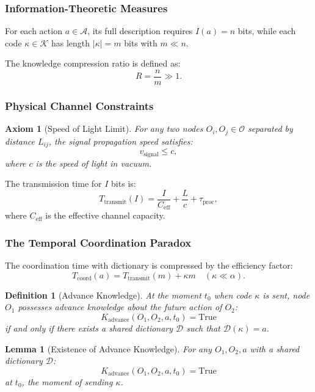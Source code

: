 \documentclass[11pt,a4paper]{article}
\newtheorem{lemma}{Lemma}
\newtheorem{axiom}{Axiom}
\newtheorem{definition}{Definition}
\begin{document}
\subsubsection{Information-Theoretic Measures}

For each action $a \in \mathcal{A}$, its full description requires $I(a) = n$ bits, while each code $\kappa \in \mathcal{K}$ has length $|\kappa| = m$ bits with $m \ll n$.

The knowledge compression ratio is defined as:
\[
R = \frac{n}{m} \gg 1.
\]

\subsubsection{Physical Channel Constraints}

\begin{axiom}[Speed of Light Limit]
	For any two nodes $O_i, O_j \in \mathcal{O}$ separated by distance $L_{ij}$, the signal propagation speed satisfies:
	\[
	v_{\text{signal}} \leq c,
	\]
	where $c$ is the speed of light in vacuum.
\end{axiom}

The transmission time for $I$ bits is:
\[
T_{\text{transmit}}(I) = \frac{I}{C_{\text{eff}}} + \frac{L}{c} + \tau_{\text{proc}},
\]
where $C_{\text{eff}}$ is the effective channel capacity.

\subsubsection{The Temporal Coordination Paradox}

The coordination time with dictionary is compressed by the efficiency factor:
\[
T_{\text{coord}}(a) = T_{\text{transmit}}(m) + \kappa m \quad (\kappa \ll \alpha).
\]

\begin{definition}[Advance Knowledge]
	At the moment $t_0$ when code $\kappa$ is sent, node $O_1$ possesses advance knowledge about the future action of $O_2$:
	\[
	K_{\text{advance}}(O_1, O_2, a, t_0) = \text{True}
	\]
	if and only if there exists a shared dictionary $\mathcal{D}$ such that $\mathcal{D}(\kappa) = a$.
\end{definition}

\begin{lemma}[Existence of Advance Knowledge]
	\label{lem:advance-knowledge}
	For any $O_1, O_2, a$ with a shared dictionary $\mathcal{D}$:
	\[
	K_{\text{advance}}(O_1, O_2, a, t_0) = \text{True}
	\]
	at $t_0$, the moment of sending $\kappa$.
\end{lemma}
\end{document}
